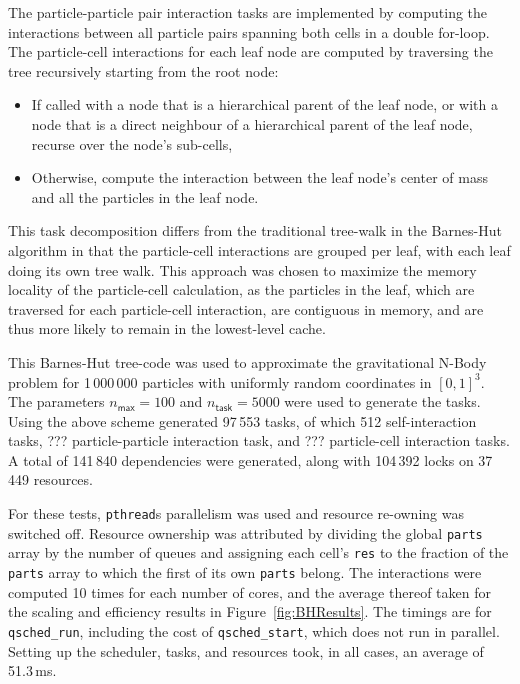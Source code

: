 \documentclass[preprint]{elsarticle}
\newcommand{\fig}[1]
    {Figure~\ref{fig:#1}}
\begin{document}
The particle-particle pair interaction tasks are implemented
by computing the interactions between all particle pairs spanning
both cells in a double for-loop.
The particle-cell interactions for each leaf node are computed by
traversing the tree recursively starting from the root node:
\begin{itemize}
  \item If called with a node that is a hierarchical parent of
    the leaf node, or with a node that is a direct neighbour of
    a hierarchical parent of the leaf node, recurse over the
    node's sub-cells,
  \item Otherwise, compute the interaction between the leaf node's
    center of mass and all the particles in the leaf node.
\end{itemize}

This task decomposition differs from the traditional tree-walk
in the Barnes-Hut algorithm in that the particle-cell interactions
are grouped per leaf, with each leaf doing its own tree walk.
This approach was chosen to maximize the memory locality
of the particle-cell calculation, as the particles in the leaf,
which are traversed for each particle-cell interaction, are
contiguous in memory, and are thus more likely to remain in the
lowest-level cache.

This Barnes-Hut tree-code was used to approximate the gravitational
N-Body problem for 1\,000\,000 particles with uniformly random coordinates
in $[0,1]^3$.
The parameters $n_\mathsf{max}=100$ and $n_\mathsf{task}=5000$
were used to generate the tasks.
Using the above scheme generated 97\,553 tasks, of which
512 self-interaction tasks, ??? particle-particle interaction
task, and ??? particle-cell interaction tasks.
A total of 141\,840 dependencies were generated, along with
104\,392 locks on 37\,449 resources.

For these tests, {\tt pthread}s parallelism was used and resource
re-owning was switched off.
Resource ownership was attributed by dividing the global
{\tt parts} array by the number of queues and assigning each cell's
{\tt res} to the fraction of the {\tt parts} array to which
the first of its own {\tt parts} belong.
The interactions were computed 10 times for each number of
cores, and the average thereof taken for the scaling and
efficiency results in \fig{BHResults}.
The timings are for {\tt qsched\_run}, including the cost of
{\tt qsched\_start}, which does not run in parallel.
Setting up the scheduler, tasks, and resources took, in all
cases, an average of 51.3\,ms.
\end{document}

